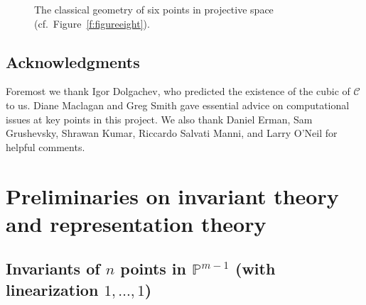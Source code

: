 \documentclass{amsart}
\theoremstyle{definition}
\theoremstyle{remark}
\def\proj{\mathbb{P}}
\def\cubic{\mathcal{C}}
\begin{document}
\begin{figure}[ht]
\begin{center}

\end{center}
\caption{The classical geometry of six points in projective space
  (cf.\ Figure~\ref{f:figureeight}).}
\label{f:figsix}
\end{figure}

\subsection{Acknowledgments}  

Foremost we thank Igor Dolgachev, who predicted the existence of the cubic of $\cubic$ to us.  Diane Maclagan and
Greg Smith gave essential advice on computational issues at key points
in this project.  We also thank Daniel Erman, Sam Grushevsky,
Shrawan Kumar, Riccardo Salvati Manni, and Larry O'Neil for helpful comments.


\section{Preliminaries on invariant theory and representation theory}

\subsection{Invariants of $n$ points in $\proj^{m-1}$ (with linearization $1, \dots, 1$)}
\label{ss:p1}
\end{document}
